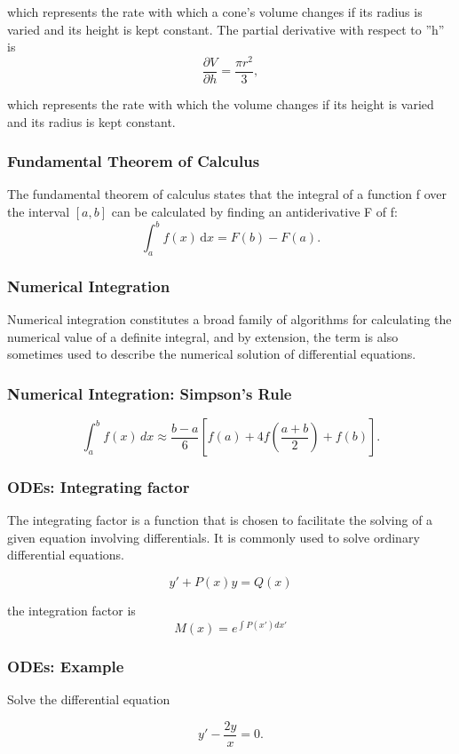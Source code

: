 \documentclass{beamer}
\begin{document}
	\begin{frame}
		which represents the rate with which a cone's volume changes if its radius is varied and its height is kept constant.
		The partial derivative with respect to ''h'' is
		\[\frac{ \partial V}{\partial h} = \frac{\pi r^2}{3},\]
		
		which represents the rate with which the volume changes if its height is varied and its radius is kept constant.
\end{frame}
\begin{frame}
\frametitle{Fundamental Theorem of Calculus}
The fundamental theorem of calculus states that the integral of a function f over the interval $[a, b]$ can be calculated by finding an antiderivative F of f:
		\[\int_a^b f(x)\,\mathrm dx = F(b) - F(a).\]
		
		
			\end{frame}
			\begin{frame}
		\frametitle{Numerical Integration}
		Numerical integration constitutes a broad family of algorithms for calculating the numerical value of a definite integral, and by extension, the term is also sometimes used to describe the numerical solution of differential equations.
		\frametitle{Numerical Integration: Simpson's Rule}
		\[\int_{a}^{b} f(x) \, dx \approx \frac{b-a}{6}\left[f(a) + 4f\left(\frac{a+b}{2}\right)+f(b)\right].\]
		
		
		
			\end{frame}
			\begin{frame}
		\frametitle{ODEs: Integrating factor}
		The integrating factor is a function that is chosen to facilitate the solving of a given equation involving differentials. It is commonly used to solve ordinary differential equations.
		
		\[ y'+ P(x)y = Q(x)\]
		
		the integration factor is
		\[M(x) = e^{\int P(x') dx'}\]
		
			\end{frame}
			\begin{frame}
		\frametitle{ODEs: Example}
		
		Solve the differential equation
		
		\[y'-\frac{2y}{x} = 0.\]
			\end{frame}
\end{document}
